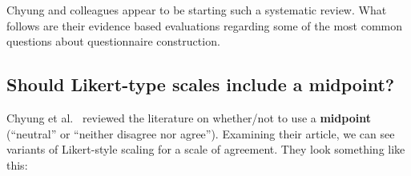 \documentclass[
  english,
]{book}
\begin{document}
Chyung and colleagues appear to be starting such a systematic review. What follows are their evidence based evaluations regarding some of the most common questions about questionnaire construction.

\hypertarget{should-likert-type-scales-include-a-midpoint}{%
\subsection{Should Likert-type scales include a midpoint?}\label{should-likert-type-scales-include-a-midpoint}}

Chyung et al.~\citeyearpar{chyung_evidence-based_2017} reviewed the literature on whether/not to use a \textbf{midpoint} (``neutral'' or ``neither disagree nor agree''). Examining their article, we can see variants of Likert-style scaling for a scale of agreement. They look something like this:
\end{document}
